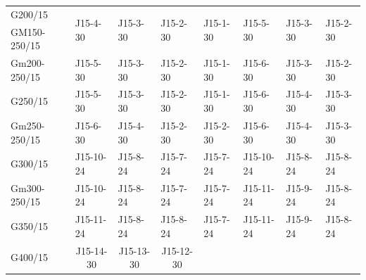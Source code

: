 \begin{longtable}[c]{|p{1.5cm}|p{1cm}|p{1cm}|p{1cm}|p{1cm}|p{1cm}|p{1cm}|p{1cm}|}
	\multicolumn{1}{|l|}{G200/15} &
	\multicolumn{1}{l|}{\multirow{2}{*}{J15-4-30}} &
	\multicolumn{1}{l|}{\multirow{2}{*}{J15-3-30}} &
	\multicolumn{1}{l|}{\multirow{2}{*}{J15-2-30}} &
	\multicolumn{1}{l|}{\multirow{2}{*}{J15-1-30}} &
	\multicolumn{1}{l|}{\multirow{2}{*}{J15-5-30}} &
	\multicolumn{1}{l|}{\multirow{2}{*}{J15-3-30}} &
	\multirow{2}{*}{J15-2-30} \\ \cline{1-1}
	\multicolumn{1}{|l|}{GM150-250/15} &
	\multicolumn{1}{l|}{} &
	\multicolumn{1}{l|}{} &
	\multicolumn{1}{l|}{} &
	\multicolumn{1}{l|}{} &
	\multicolumn{1}{l|}{} &
	\multicolumn{1}{l|}{} &
	\\ \hline
	\multicolumn{1}{|l|}{Gm200-250/15} &
	\multicolumn{1}{l|}{J15-5-30} &
	\multicolumn{1}{l|}{J15-3-30} &
	\multicolumn{1}{l|}{J15-2-30} &
	\multicolumn{1}{l|}{J15-1-30} &
	\multicolumn{1}{l|}{J15-6-30} &
	\multicolumn{1}{l|}{J15-3-30} &
	J15-2-30 \\ \hline
	\multicolumn{1}{|l|}{G250/15} &
	\multicolumn{1}{l|}{J15-5-30} &
	\multicolumn{1}{l|}{J15-3-30} &
	\multicolumn{1}{l|}{J15-2-30} &
	\multicolumn{1}{l|}{J15-1-30} &
	\multicolumn{1}{l|}{J15-6-30} &
	\multicolumn{1}{l|}{J15-4-30} &
	J15-3-30 \\ \hline
	\multicolumn{1}{|l|}{Gm250-250/15} &
	\multicolumn{1}{l|}{J15-6-30} &
	\multicolumn{1}{l|}{J15-4-30} &
	\multicolumn{1}{l|}{J15-2-30} &
	\multicolumn{1}{l|}{J15-2-30} &
	\multicolumn{1}{l|}{J15-6-30} &
	\multicolumn{1}{l|}{J15-4-30} &
	J15-3-30 \\ \hline
	\multicolumn{1}{|l|}{G300/15} &
	\multicolumn{1}{l|}{J15-10-24} &
	\multicolumn{1}{l|}{J15-8-24} &
	\multicolumn{1}{l|}{J15-7-24} &
	\multicolumn{1}{l|}{J15-7-24} &
	\multicolumn{1}{l|}{J15-10-24} &
	\multicolumn{1}{l|}{J15-8-24} &
	J15-8-24 \\ \hline
	\multicolumn{1}{|l|}{Gm300-250/15} &
	\multicolumn{1}{l|}{J15-10-24} &
	\multicolumn{1}{l|}{J15-8-24} &
	\multicolumn{1}{l|}{J15-7-24} &
	\multicolumn{1}{l|}{J15-7-24} &
	\multicolumn{1}{l|}{J15-11-24} &
	\multicolumn{1}{l|}{J15-9-24} &
	J15-8-24 \\ \hline
	\multicolumn{1}{|l|}{G350/15} &
	\multicolumn{1}{l|}{J15-11-24} &
	\multicolumn{1}{l|}{J15-8-24} &
	\multicolumn{1}{l|}{J15-8-24} &
	\multicolumn{1}{l|}{J15-7-24} &
	\multicolumn{1}{l|}{J15-11-24} &
	\multicolumn{1}{l|}{J15-9-24} &
	J15-8-24 \\ \hline
	\multicolumn{1}{|l|}{G400/15} &
	\multicolumn{1}{c|}{\multirow{2}{*}{J15-14-30}} &
	\multicolumn{1}{c|}{\multirow{2}{*}{J15-13-30}} &
	\multicolumn{1}{c|}{\multirow{2}{*}{J15-12-30}} &

\end{longtable}
